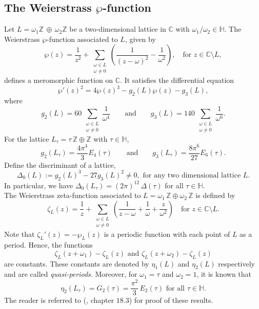 \documentclass[11pt, reqno]{amsart}
\begin{document}
\subsection{The Weierstrass $\wp$-function}
 Let $L=\omega_1 \mathbb{Z} \,  \oplus \, \omega_2 \mathbb{Z}$ be a two-dimensional lattice in $\mathbb{C}$ with $\omega_1/\omega_2 \in \mathbb{H}$. The Weierstrass $\wp$-function associated to $L$, given by
\begin{equation}\label{wpfunction}
\wp (z)=\frac{1}{z^2}+\sum_{\substack{\omega\in L\\
\omega\neq 0}}\left(\frac{1}{(z-\omega)^2}-\frac{1}{\omega^2} \right), \quad \text{for }z\in \mathbb{C}\setminus L,
\end{equation}
defines a meromorphic function on $\mathbb{C}$. It satisfies the differential equation
\begin{equation} \label{dell}
 \wp'(z)^2=4\wp(z)^3-g_2(L)\wp(z)-g_3(L),   
\end{equation}
where 
\begin{equation*}
    g_2(L)=60\, \sum_{\substack{\omega \in L\\ \omega\neq 0}} \frac{1}{\omega^{4}} \qquad \text{and} \qquad g_3(L)=140\, \sum_{\substack{\omega \in L\\ \omega\neq 0}} \frac{1}{\omega^{6}}.
\end{equation*}
For the lattice $L_\tau=\tau\,\mathbb{Z}\oplus \mathbb{Z}$ with $\tau\in\mathbb{H}$, 
\begin{equation*}
    g_2(L_\tau)=\frac{4\pi^4}{3}E_4(\tau) \qquad \text{and} \qquad g_3(L_\tau)=\frac{8\pi^6}{27}E_6(\tau).
\end{equation*}
Define the discriminant of a lattice, $$\Delta_0(L):=g_2(L)^3-27g_3(L)^2\neq 0, \text{ for any two dimensional lattice }L.$$ In particular, we have $\Delta_0(L_\tau)=(2\pi)^{12}\,\Delta(\tau)$ for all $\tau\in\mathbb{H}$.\\

The Weierstrass zeta-function associated to $L=\omega_1\,\mathbb{Z}\oplus \omega_2\,\mathbb{Z}$ is defined by
$$
\zeta_{L}(z)=\frac{1}{z}+\sum_{\substack{\omega\in L\\ \omega\neq 0}}\left(\frac{1}{z-\omega}+\frac{1}{\omega}+\frac{z}{\omega^2} \right)\quad \text{for } z\in \mathbb{C}\setminus L.
$$
Note that $\zeta_{L}'(z)=-\wp_L(z)$ is a periodic function with each point of $L$ as a period. Hence, the functions $$\zeta_{L}(z+\omega_1)-\zeta_{L}(z) \text{  and  } \zeta_{L}(z+\omega_2)-\zeta_{L}(z)$$ are constants. These constants are denoted by $\eta_1(L)$ and $ \eta_2(L)$ respectively and are called \emph{quasi-periods}. Moreover, for $\omega_1 = \tau$ and $\omega_2 = 1$, it is known that 
\begin{equation}\label{quasi-period}
\eta_2(L_\tau)=G_2(\tau)=\frac{\pi^2}{3}\, E_2(\tau) \text{ 
  for all }\tau\in\mathbb{H}. 
\end{equation}
The reader is referred to (\cite{lang}, chapter $18.3$) for proof of these results.\\
\end{document}
